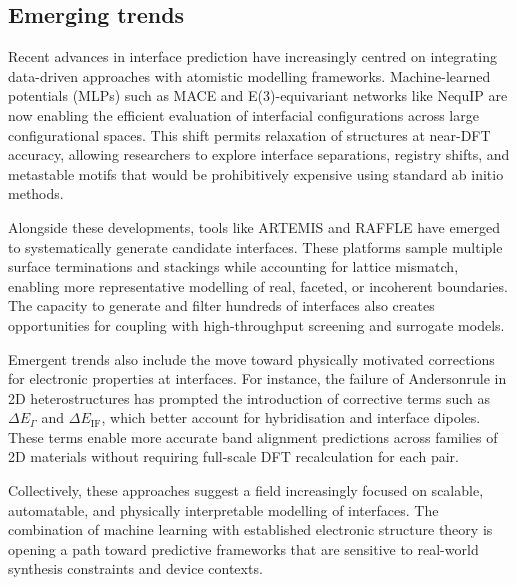 \subsection{Emerging trends}

Recent advances in interface prediction have increasingly centred on integrating data-driven approaches with atomistic modelling frameworks. Machine-learned potentials (MLPs) such as MACE and E(3)-equivariant networks like NequIP are now enabling the efficient evaluation of interfacial configurations across large configurational spaces. This shift permits relaxation of structures at near-DFT accuracy, allowing researchers to explore interface separations, registry shifts, and metastable motifs that would be prohibitively expensive using standard ab initio methods.

Alongside these developments, tools like ARTEMIS and RAFFLE have emerged to systematically generate candidate interfaces. These platforms sample multiple surface terminations and stackings while accounting for lattice mismatch, enabling more representative modelling of real, faceted, or incoherent boundaries. The capacity to generate and filter hundreds of interfaces also creates opportunities for coupling with high-throughput screening and surrogate models.

Emergent trends also include the move toward physically motivated corrections for electronic properties at interfaces. For instance, the failure of Anderson\rqss rule in 2D heterostructures has prompted the introduction of corrective terms such as $\Delta E_\Gamma$ and $\Delta E_\mathrm{IF}$, which better account for hybridisation and interface dipoles. These terms enable more accurate band alignment predictions across families of 2D materials without requiring full-scale DFT recalculation for each pair.

Collectively, these approaches suggest a field increasingly focused on scalable, automatable, and physically interpretable modelling of interfaces. The combination of machine learning with established electronic structure theory is opening a path toward predictive frameworks that are sensitive to real-world synthesis constraints and device contexts.